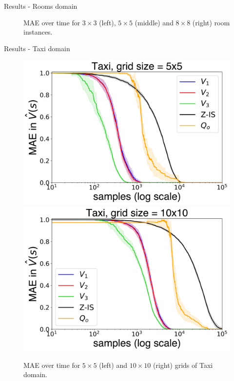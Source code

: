 \documentclass{beamer}
\theoremstyle{mystyle}
\begin{document}
\begin{frame}{Results - Rooms domain}
\begin{figure}[H]
\caption{MAE over time for $3 \times 3$ (left), $5 \times 5$ (middle) and $8 \times 8$ (right) room instances.}
\label{fig:errors_grid}
\end{figure}

\end{frame}

\begin{frame}{Results - Taxi domain}

\begin{figure}[H]
\centering
\includegraphics[scale=0.22]{Figures/taxi_5-1.png}
\includegraphics[scale=0.22]{Figures/taxi_10-1.png}
\caption{MAE over time for $5 \times 5$ (left) and $10 \times 10$ (right) grids of Taxi domain.}
\label{fig:errors_taxi}
\end{figure}

\end{frame}
\end{document}
